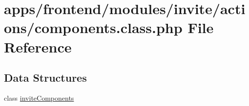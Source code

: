 \hypertarget{frontend_2modules_2invite_2actions_2components_8class_8php}{\section{apps/frontend/modules/invite/actions/components.class.\-php File Reference}
\label{frontend_2modules_2invite_2actions_2components_8class_8php}
}
\subsection*{Data Structures}
\begin{DoxyCompactItemize}
\item 
class \hyperlink{classinvite_components}{invite\-Components}
\end{DoxyCompactItemize}
